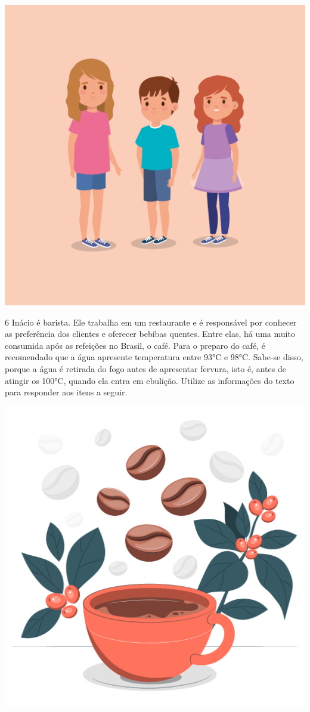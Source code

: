 \begin{center}
\includegraphics[width=.7\textwidth]{media/image24a.jpeg}
\end{center}


\num{6} Inácio é barista. Ele trabalha em um restaurante e é responsável
por conhecer as preferência dos clientes e oferecer bebibas quentes. Entre elas, há uma muito consumida após as refeições no Brasil, o café. Para o preparo do café, é recomendado que a água apresente temperatura entre 93°C e 98°C. Sabe-se disso, porque a água é retirada do fogo antes de apresentar fervura, isto é, antes de atingir os 100°C, quando ela entra em ebulição. Utilize as informações do texto para responder aos itens a seguir.

\begin{center}
\includegraphics[width=.4\textwidth]{media/image24c.jpeg}
\end{center}

